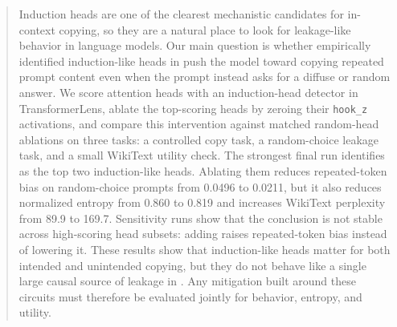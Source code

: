 \begin{abstract}
Induction heads are one of the clearest mechanistic candidates for in-context copying, so they are a natural place to look for leakage-like behavior in language models. Our main question is whether empirically identified induction-like heads in \gptsmall push the model toward copying repeated prompt content even when the prompt instead asks for a diffuse or random answer. We score attention heads with an induction-head detector in TransformerLens, ablate the top-scoring heads by zeroing their \texttt{hook\_z} activations, and compare this intervention against matched random-head ablations on three tasks: a controlled copy task, a random-choice leakage task, and a small WikiText utility check. The strongest final run identifies \headpair as the top two induction-like heads. Ablating them reduces repeated-token bias on random-choice prompts from 0.0496 to 0.0211, but it also reduces normalized entropy from 0.860 to 0.819 and increases WikiText perplexity from 89.9 to 169.7. Sensitivity runs show that the conclusion is not stable across high-scoring head subsets: adding \headlsix raises repeated-token bias instead of lowering it. These results show that induction-like heads matter for both intended and unintended copying, but they do not behave like a single large causal source of leakage in \gptsmall. Any mitigation built around these circuits must therefore be evaluated jointly for behavior, entropy, and utility.
\end{abstract}
